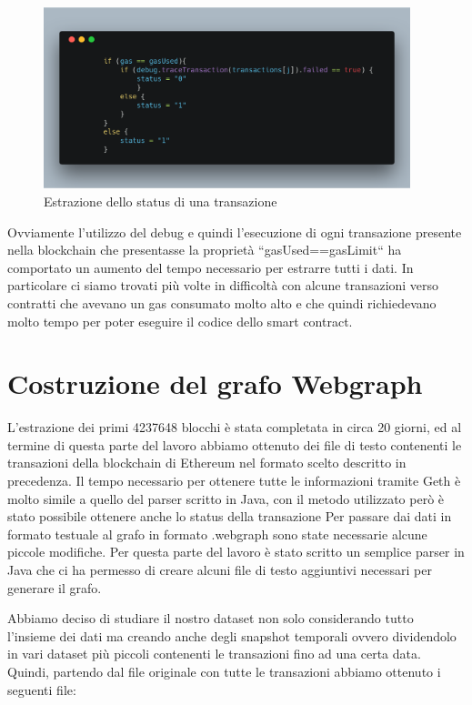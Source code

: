 \documentclass[12pt]{report}
\begin{document}
\begin{figure}[H]
    \centering\includegraphics[width=0.95\textwidth]{carbon-21}
    \caption{Estrazione dello status di una transazione}
\end{figure}
Ovviamente l'utilizzo del debug e quindi l'esecuzione di ogni transazione presente nella blockchain che presentasse la proprietà ``gasUsed==gasLimit`` ha comportato un aumento del tempo necessario per estrarre tutti i dati. 
In particolare ci siamo trovati più volte in difficoltà con alcune transazioni verso contratti che avevano un gas consumato molto alto e che quindi richiedevano molto tempo per poter eseguire il codice dello smart contract.

\section{Costruzione del grafo Webgraph}

L'estrazione dei primi 4237648 blocchi è stata completata in circa 20 giorni, ed al termine di questa parte del lavoro abbiamo ottenuto dei file di testo contenenti le transazioni della blockchain di Ethereum nel formato scelto descritto in precedenza. 
Il tempo necessario per ottenere tutte le informazioni tramite Geth è molto simile a quello del parser scritto in Java, con il metodo utilizzato però è stato possibile ottenere anche lo status della transazione
Per passare dai dati in formato testuale al grafo in formato .webgraph sono state necessarie alcune piccole modifiche.
Per questa parte del lavoro è stato scritto un semplice parser in Java che ci ha permesso di creare alcuni file di testo aggiuntivi necessari per generare il grafo.

Abbiamo deciso di studiare il nostro dataset non solo considerando tutto l'insieme dei dati ma creando anche degli snapshot temporali ovvero dividendolo in vari dataset più piccoli contenenti le transazioni fino ad una certa data.
Quindi, partendo dal file originale con tutte le transazioni abbiamo ottenuto i seguenti file:
\end{document}
